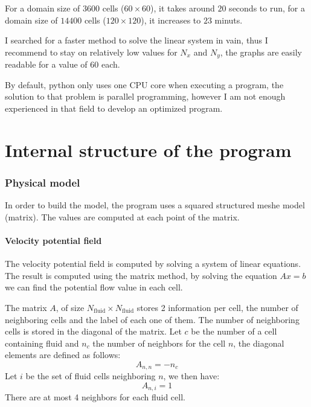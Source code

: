 For a domain size of $\num{3600}$ cells ($\num{60} \times \num{60}$), it takes
around $\num{20}$ seconds to run, for a domain size of $\num{14400}$ cells
($\num{120} \times \num{120}$), it increases to $\num{23}$ minuts. 

I searched for a faster method to solve the linear system in vain, thus I
recommend to stay on relatively low values for $N_x$ and $N_y$, the graphs are
easily readable for a value of $\num{60}$ each.

By default, python only uses one CPU core when executing a program, the
solution to that problem is parallel programming, however I am not enough
experienced in that field to develop an optimized program.

\newpage
\part{Internal structure of the program}
\section{Physical model}
In order to build the model, the program uses a squared structured meshe
model (matrix). The values are computed at each point of the matrix.

\subsection{Velocity potential field}
The velocity potential field is computed by solving a system of linear
equations. The result is computed using the matrix method, by solving the
equation $Ax = b$ we can find the potential flow value in each cell.

The matrix $A$, of size $N_\text{fluid} \times N_\text{fluid}$ stores 2
information per cell, the number of neighboring cells and the label of each
one of them. The number of neighboring cells is stored in the diagonal of the
 matrix. Let $c$ be the number of a cell containing fluid and $n_c$ the number
 of neighbors for the cell $n$, the diagonal elements are defined as follows:
\[
      A_{n, n} = -n_c
\]
Let $i$ be the set of fluid cells neighboring $n$, we then have:
\[
      A_{n, i} = 1
\]
There are at most 4 neighbors for each fluid cell.

